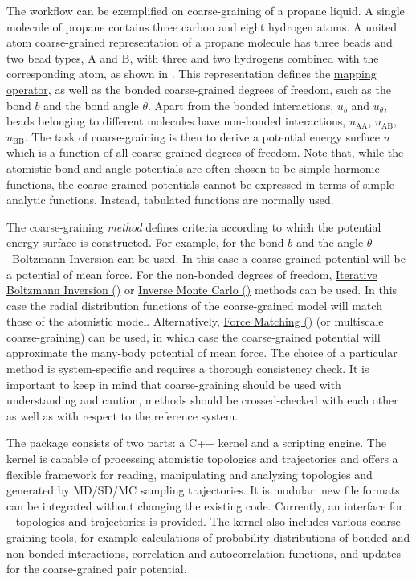 The workflow can be exemplified on coarse-graining of a propane liquid. A single molecule of propane contains three carbon and eight hydrogen atoms. A united atom coarse-grained representation of a propane molecule has three beads and two bead types, A and B, with three and two hydrogens combined with the corresponding atom, as shown in . This representation defines the \hyperref[sec:mapping_operator]{mapping operator}, as well as the bonded coarse-grained degrees of freedom, such as the bond $b$ and the bond angle $\theta$. Apart from the bonded interactions, $u_b$ and $u_\theta$, beads belonging to different molecules have non-bonded interactions, $u_\text{AA}$, $u_\text{AB}$, $u_\text{BB}$. The task of coarse-graining is then to derive a potential energy surface $u$ which is a function of all coarse-grained degrees of freedom. Note that, while the atomistic bond and angle potentials are often chosen to be simple harmonic functions, the coarse-grained potentials cannot be expressed in terms of simple analytic functions. Instead, tabulated functions are normally used.

The coarse-graining {\em method} defines criteria according to which the potential energy surface is constructed. For example, for the bond $b$ and the angle $\theta$~\hyperref[sec:bi]{Boltzmann Inversion} can be used. In this case a coarse-grained potential will be a potential of mean force. For the non-bonded degrees of freedom,
\hyperref[sec:ibi]{Iterative Boltzmann Inversion (\ibi)} or \hyperref[sec:imc]{Inverse Monte Carlo (\imc)} methods can be used. In this case the radial distribution functions of the coarse-grained model will match those of the atomistic model. Alternatively, \hyperref[sec:fm]{Force Matching (\fm)} (or multiscale coarse-graining) can be used, in which case the coarse-grained potential will approximate the many-body potential of mean force. The choice of a particular method is system-specific and requires a thorough consistency check. It is important to keep in mind that coarse-graining should be used with understanding and caution, methods should be crossed-checked with each other as well as with respect to the reference system.

The package consists of two parts: a C++ kernel and a scripting engine. The kernel is capable of processing atomistic topologies and trajectories and offers a flexible framework for reading, manipulating and analyzing topologies and generated by MD/SD/MC sampling trajectories. It is modular: new file formats can be integrated without changing the existing code. Currently, an interface for \gromacs~\cite{gromacs4} topologies and trajectories is provided.
%
The kernel also includes various coarse-graining tools, for example calculations of probability distributions of bonded and non-bonded interactions, correlation and autocorrelation functions, and updates for the coarse-grained pair potential.

